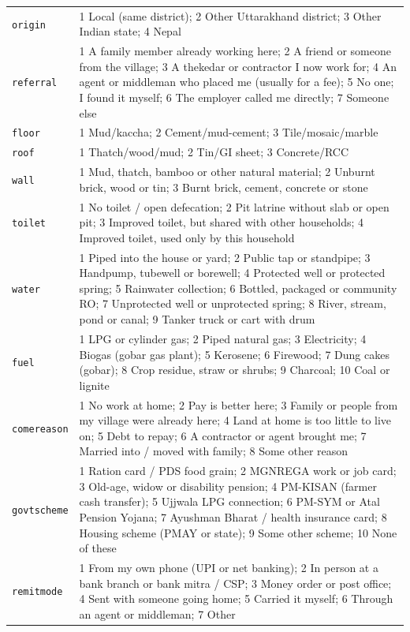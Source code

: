 \documentclass[10pt]{article}
\begin{document}
{\begin{longtable}{p{2cm}p{14cm}}
\texttt{origin} & 1 Local (same district); 2 Other Uttarakhand district; 3 Other Indian state; 4 Nepal \\
\texttt{referral} & 1 A family member already working here; 2 A friend or someone from the village; 3 A thekedar or contractor I now work for; 4 An agent or middleman who placed me (usually for a fee); 5 No one; I found it myself; 6 The employer called me directly; 7 Someone else \\
\texttt{floor} & 1 Mud/kaccha; 2 Cement/mud-cement; 3 Tile/mosaic/marble \\
\texttt{roof} & 1 Thatch/wood/mud; 2 Tin/GI sheet; 3 Concrete/RCC \\
\texttt{wall} & 1 Mud, thatch, bamboo or other natural material; 2 Unburnt brick, wood or tin; 3 Burnt brick, cement, concrete or stone \\
\texttt{toilet} & 1 No toilet / open defecation; 2 Pit latrine without slab or open pit; 3 Improved toilet, but shared with other households; 4 Improved toilet, used only by this household \\
\texttt{water} & 1 Piped into the house or yard; 2 Public tap or standpipe; 3 Handpump, tubewell or borewell; 4 Protected well or protected spring; 5 Rainwater collection; 6 Bottled, packaged or community RO; 7 Unprotected well or unprotected spring; 8 River, stream, pond or canal; 9 Tanker truck or cart with drum \\
\texttt{fuel} & 1 LPG or cylinder gas; 2 Piped natural gas; 3 Electricity; 4 Biogas (gobar gas plant); 5 Kerosene; 6 Firewood; 7 Dung cakes (gobar); 8 Crop residue, straw or shrubs; 9 Charcoal; 10 Coal or lignite \\
\texttt{comereason} & 1 No work at home; 2 Pay is better here; 3 Family or people from my village were already here; 4 Land at home is too little to live on; 5 Debt to repay; 6 A contractor or agent brought me; 7 Married into / moved with family; 8 Some other reason \\
\texttt{govtscheme} & 1 Ration card / PDS food grain; 2 MGNREGA work or job card; 3 Old-age, widow or disability pension; 4 PM-KISAN (farmer cash transfer); 5 Ujjwala LPG connection; 6 PM-SYM or Atal Pension Yojana; 7 Ayushman Bharat / health insurance card; 8 Housing scheme (PMAY or state); 9 Some other scheme; 10 None of these \\
\texttt{remitmode} & 1 From my own phone (UPI or net banking); 2 In person at a bank branch or bank mitra / CSP; 3 Money order or post office; 4 Sent with someone going home; 5 Carried it myself; 6 Through an agent or middleman; 7 Other \\

\end{longtable}}
\end{document}
